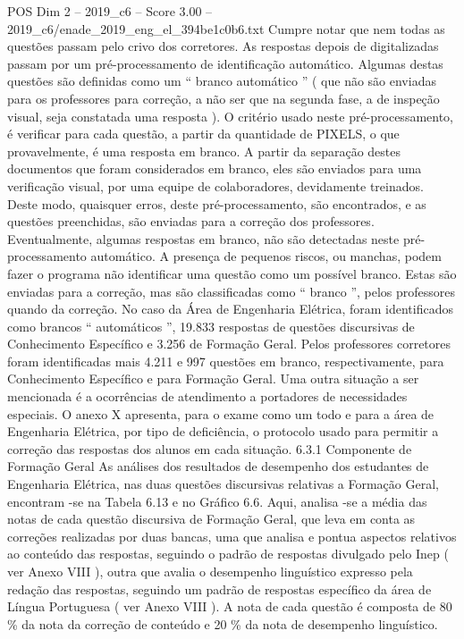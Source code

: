 \begin{textsample}{POS Dim 2 – 2019\_c6 – Score 3.00 – 2019\_c6/enade\_2019\_eng\_el\_394be1c0b6.txt}
Cumpre notar que nem todas as questões passam pelo crivo dos corretores.
As respostas depois de digitalizadas passam por um pré-processamento de identificação automático.
Algumas destas questões são definidas como um “ branco automático ” ( que não são enviadas para os professores para correção, a não ser que na segunda fase, a de inspeção visual, seja constatada uma resposta ).
O critério usado neste pré-processamento, é verificar para cada questão, a partir da quantidade de PIXELS, o que provavelmente, é uma resposta em branco.
A partir da separação destes documentos que foram considerados em branco, eles são enviados para uma verificação visual, por uma equipe de colaboradores, devidamente treinados.
Deste modo, quaisquer erros, deste pré-processamento, são encontrados, e as questões preenchidas, são enviadas para a correção dos professores.
Eventualmente, algumas respostas em branco, não são detectadas neste pré-processamento automático.
A presença de pequenos riscos, ou manchas, podem fazer o programa não identificar uma questão como um possível branco.
Estas são enviadas para a correção, mas são classificadas como “ branco ”, pelos professores quando da correção.
No caso da Área de Engenharia Elétrica, foram identificados como brancos “ automáticos ”, 19.833 respostas de questões discursivas de Conhecimento Específico e 3.256 de Formação Geral.
Pelos professores corretores foram identificadas mais 4.211 e 997 questões em branco, respectivamente, para Conhecimento Específico e para Formação Geral.
Uma outra situação a ser mencionada é a ocorrências de atendimento a portadores de necessidades especiais.
O anexo X apresenta, para o exame como um todo e para a área de Engenharia Elétrica, por tipo de deficiência, o protocolo usado para permitir a correção das respostas dos alunos em cada situação. 6.3.1 Componente de Formação Geral As análises dos resultados de desempenho dos estudantes de Engenharia Elétrica, nas duas questões discursivas relativas a Formação Geral, encontram -se na Tabela 6.13 e no Gráfico 6.6.
Aqui, analisa -se a média das notas de cada questão discursiva de Formação Geral, que leva em conta as correções realizadas por duas bancas, uma que analisa e pontua aspectos relativos ao conteúdo das respostas, seguindo o padrão de respostas divulgado pelo Inep ( ver Anexo VIII ), outra que avalia o desempenho linguístico expresso pela redação das respostas, seguindo um padrão de respostas específico da área de Língua Portuguesa ( ver Anexo VIII ).
A nota de cada questão é composta de 80 \% da nota da correção de conteúdo e 20 \% da nota de desempenho linguístico.

\end{textsample}
